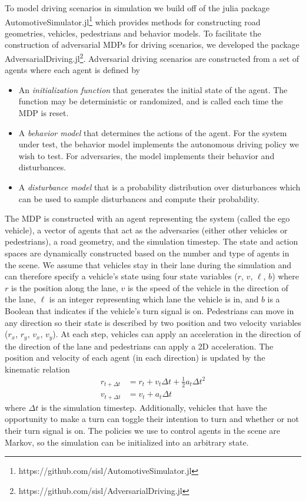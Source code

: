 To model driving scenarios in simulation we build off of the julia package AutomotiveSimulator.jl\footnote{https://github.com/sisl/AutomotiveSimulator.jl} which provides methods for constructing road geometries, vehicles, pedestrians and behavior models. To facilitate the construction of adversarial MDPs for driving scenarios, we developed the package AdversarialDriving.jl\footnote{https://github.com/sisl/AdversarialDriving.jl}. Adversarial driving scenarios are constructed from a set of agents where each agent is defined by
\begin{itemize}
    \item An \emph{initialization function} that generates the initial state of the agent. The function may be deterministic or randomized, and is called each time the MDP is reset. 
    \item A \emph{behavior model} that determines the actions of the agent. For the system under test, the behavior model implements the autonomous driving policy we wish to test. For adversaries, the model implements their behavior and disturbances.
    \item A \emph{disturbance model} that is a probability distribution over disturbances which can be used to sample disturbances and compute their probability. 
\end{itemize}

The MDP is constructed with an agent representing the system (called the ego vehicle), a vector of agents that act as the adversaries (either other vehicles or pedestrians), a road geometry, and the simulation timestep. The state and action spaces are dynamically constructed based on the number and type of agents in the scene. We assume that vehicles stay in their lane during the simulation and can therefore specify a vehicle's state using four state variables ($r$, $v$, $\ell$, $b$) where $r$ is the position along the lane, $v$ is the speed of the vehicle in the direction of the lane, $\ell$ is an integer representing which lane the vehicle is in, and $b$ is a Boolean that indicates if the vehicle's turn signal is on. Pedestrians can move in any direction so their state is described by two position and two velocity variables ($r_x$, $r_y$, $v_x$, $v_y$). At each step, vehicles can apply an acceleration in the direction of the direction of the lane and pedestrians can apply a 2D acceleration. The position and velocity of each agent (in each direction) is updated by the kinematic relation
\begin{equation}
\begin{split}
    r_{t+\Delta t} &= r_t + v_t \Delta t + \frac{1}{2} a_t \Delta t^2 \\
    v_{t+\Delta t} &= v_t + a_t \Delta t
    \end{split}
    \label{eq:kinematics}
\end{equation}
where $\Delta t$ is the simulation timestep. Additionally, vehicles that have the opportunity to make a turn can toggle their intention to turn and whether or not their turn signal is on. The policies we use to control agents in the scene are Markov, so the simulation can be initialized into an arbitrary state.


